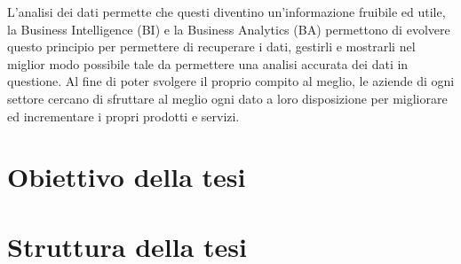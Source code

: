 L’analisi dei dati permette che questi diventino un’informazione fruibile ed utile, la Business Intelligence (BI) e la Business Analytics (BA) permettono di evolvere questo principio per permettere di recuperare i dati, gestirli e mostrarli nel miglior modo possibile tale da permettere una analisi accurata dei dati in questione. Al fine di poter svolgere il proprio compito al meglio, le aziende di ogni settore cercano di sfruttare al meglio ogni dato a loro disposizione per migliorare ed incrementare i propri prodotti e servizi.

\section{Obiettivo della tesi}

\section{Struttura della tesi}